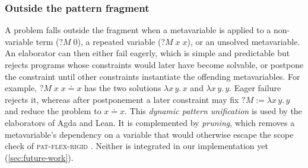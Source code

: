 \subsubsection{Outside the pattern fragment}\label{section:outside_pattern_fragment}
A problem falls outside the fragment when a metavariable is applied to a
non-variable term ($?M\;0$), a repeated variable ($?M\;x\;x$), or an unsolved
metavariable. An elaborator can then either fail eagerly, which is
simple and predictable but rejects programs whose constraints would later have
become solvable, or postpone the constraint until other constraints
instantiate the offending metavariables. For example, $?M\;x\;x \doteq x$ has
the two solutions $\lambda x\,y.\,x$ and $\lambda x\,y.\,y$. Eager failure
rejects it, whereas after postponement a later constraint may fix
$?M := \lambda x\,y.\,y$ and reduce the problem to $x \doteq x$. This
\emph{dynamic pattern unification} \autocite{abel_extensions_2018} is used by
the elaborators of Agda and Lean. It is complemented by \emph{pruning}, which
removes a metavariable's dependency on a variable that would otherwise escape
the scope check of \textsc{pat-flex-rigid} \autocite{abel_extensions_2018}.
Neither is integrated in our implementation yet (\cref{sec:future-work}).
